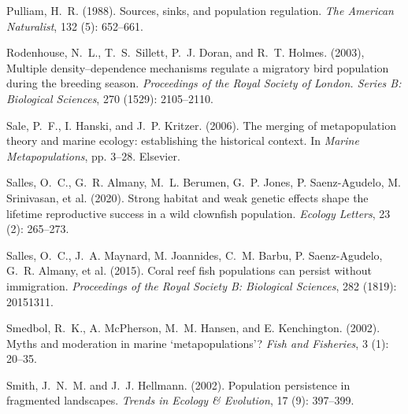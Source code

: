 \documentclass[12pt, oneside]{article}   	%
\begin{document}
\begin{thebibliography}{66}
Pulliam, H.~R. (1988).
\newblock Sources, sinks, and population regulation.
\newblock \emph{The American Naturalist}, 132 (5): 652--661.

Rodenhouse, N.~L., T.~S.~Sillett, P.~J. Doran, and R.~T. Holmes. (2003),
\newblock Multiple density--dependence mechanisms regulate a migratory bird
  population during the breeding season.
\newblock \emph{Proceedings of the Royal Society of London. Series B:
  Biological Sciences}, 270 (1529): 2105--2110.

Sale, P.~F., I. Hanski, and J.~P. Kritzer. (2006).
\newblock The merging of metapopulation theory and marine ecology: establishing
  the historical context.
\newblock In \emph{Marine Metapopulations}, pp. 3--28. Elsevier.

Salles, O.~C., G.~R. Almany, M.~L. Berumen, G.~P. Jones, P.
  Saenz-Agudelo, M. Srinivasan, et al. (2020).
\newblock Strong habitat and weak genetic effects shape the lifetime
  reproductive success in a wild clownfish population.
\newblock \emph{Ecology Letters}, 23 (2): 265--273.

Salles, O.~C., J.~A. Maynard, M. Joannides, C.~M. Barbu, P.
  Saenz-Agudelo, G.~R. Almany, et al. (2015).
\newblock Coral reef fish populations can persist without immigration.
\newblock \emph{Proceedings of the Royal Society B: Biological Sciences},
  282 (1819): 20151311.

Smedbol, R.~K., A. McPherson, M.~M. Hansen, and E. Kenchington. (2002).
\newblock Myths and moderation in marine ‘metapopulations’?
\newblock \emph{Fish and Fisheries}, 3 (1): 20--35.

Smith, J.~N.~M. and J.~J. Hellmann. (2002).
\newblock Population persistence in fragmented landscapes.
\newblock \emph{Trends in Ecology \& Evolution}, 17 (9):
  397--399.


\end{thebibliography}
\end{document}
